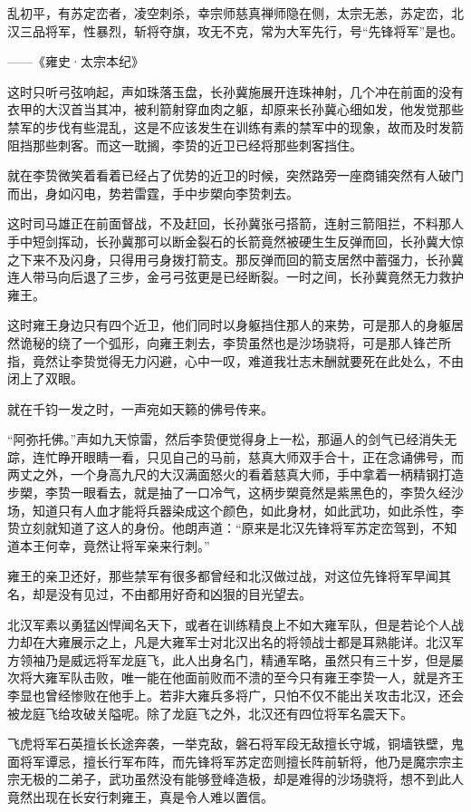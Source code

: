 乱初平，有苏定峦者，凌空刺杀，幸宗师慈真禅师隐在侧，太宗无恙，苏定峦，北汉三品将军，性暴烈，斩将夺旗，攻无不克，常为大军先行，号“先锋将军”是也。

——《雍史·太宗本纪》

这时只听弓弦响起，声如珠落玉盘，长孙冀施展开连珠神射，几个冲在前面的没有衣甲的大汉首当其冲，被利箭射穿血肉之躯，却原来长孙冀心细如发，他发觉那些禁军的步伐有些混乱，这是不应该发生在训练有素的禁军中的现象，故而及时发箭阻挡那些刺客。而这一耽搁，李贽的近卫已经将那些刺客挡住。

就在李贽微笑着看着已经占了优势的近卫的时候，突然路旁一座商铺突然有人破门而出，身如闪电，势若雷霆，手中步槊向李贽刺去。

这时司马雄正在前面督战，不及赶回，长孙冀张弓搭箭，连射三箭阻拦，不料那人手中短剑挥动，长孙冀那可以断金裂石的长箭竟然被硬生生反弹而回，长孙冀大惊之下来不及闪身，只得用弓身拨打箭支。那反弹而回的箭支居然中蓄强力，长孙冀连人带马向后退了三步，金弓弓弦更是已经断裂。一时之间，长孙冀竟然无力救护雍王。

这时雍王身边只有四个近卫，他们同时以身躯挡住那人的来势，可是那人的身躯居然诡秘的绕了一个弧形，向雍王刺去，李贽虽然也是沙场骁将，可是那人锋芒所指，竟然让李贽觉得无力闪避，心中一叹，难道我壮志未酬就要死在此处么，不由闭上了双眼。

就在千钧一发之时，一声宛如天籁的佛号传来。

“阿弥托佛。”声如九天惊雷，然后李贽便觉得身上一松，那逼人的剑气已经消失无踪，连忙睁开眼睛一看，只见自己的马前，慈真大师双手合十，正在念诵佛号，而两丈之外，一个身高九尺的大汉满面怒火的看着慈真大师，手中拿着一柄精钢打造步槊，李贽一眼看去，就是抽了一口冷气，这柄步槊竟然是紫黑色的，李贽久经沙场，知道只有人血才能将兵器染成这个颜色，如此身材，如此武功，如此杀性，李贽立刻就知道了这人的身份。他朗声道：“原来是北汉先锋将军苏定峦驾到，不知道本王何幸，竟然让将军亲来行刺。”

雍王的亲卫还好，那些禁军有很多都曾经和北汉做过战，对这位先锋将军早闻其名，却是没有见过，不由都用好奇和凶狠的目光望去。

北汉军素以勇猛凶悍闻名天下，或者在训练精良上不如大雍军队，但是若论个人战力却在大雍展示之上，凡是大雍军士对北汉出名的将领战士都是耳熟能详。北汉军方领袖乃是威远将军龙庭飞，此人出身名门，精通军略，虽然只有三十岁，但是屡次将大雍军队击败，唯一能在他面前败而不溃的至今只有雍王李贽一人，就是齐王李显也曾经惨败在他手上。若非大雍兵多将广，只怕不仅不能出关攻击北汉，还会被龙庭飞给攻破关隘呢。除了龙庭飞之外，北汉还有四位将军名震天下。

飞虎将军石英擅长长途奔袭，一举克敌，磐石将军段无敌擅长守城，铜墙铁壁，鬼面将军谭忌，擅长行军布阵，而先锋将军苏定峦则擅长阵前斩将，他乃是魔宗宗主宗无极的二弟子，武功虽然没有能够登峰造极，却是难得的沙场骁将，想不到此人竟然出现在长安行刺雍王，真是令人难以置信。

